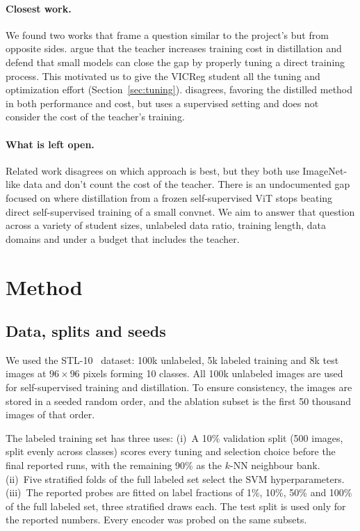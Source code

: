 \documentclass[letterpaper,11pt]{article}
\begin{document}
\paragraph{Closest work.}
We found two works that frame a question similar to the project's but from opposite sides. \citet{shi2022smallssl} argue that the teacher increases training cost in distillation and defend that small models can close the gap by properly tuning a direct training process. This motivated us to give the VICReg student all the tuning and optimization effort (Section~\ref{sec:tuning}). \citet{farhat2024distillalt} disagrees, favoring the distilled method in both performance and cost, but uses a supervised setting and does not consider the cost of the teacher's training.

\paragraph{What is left open.}
Related work disagrees on which approach is best, but they both use ImageNet-like data and don't count the cost of the teacher. There is an undocumented gap focused on where distillation from a frozen self-supervised ViT stops beating direct self-supervised training of a small convnet. We aim to answer that question across a variety of student sizes, unlabeled data ratio, training length, data domains and under a budget that includes the teacher.


\section{Method}
\label{sec:method}

\subsection{Data, splits and seeds}
\label{sec:data}

We used the STL-10~\citep{coates2011stl10} dataset: 100k unlabeled, 5k labeled training and 8k test
images at $96\times96$ pixels forming 10 classes. All 100k unlabeled images are used for
self-supervised training and distillation.
To ensure consistency, the images are stored in a seeded random order, and the ablation subset is the first 50 thousand images of that order. 

The labeled training set has three uses: (i)~A 10\% validation split (500 images, split evenly across classes) scores every tuning and selection choice before the final reported runs, with the remaining 90\% as the $k$-NN neighbour bank.
(ii)~Five stratified folds of the full labeled set select the SVM hyperparameters.
(iii)~The reported probes are fitted on label fractions of 1\%, 10\%, 50\% and 100\% of the
full labeled set, three stratified draws each. The test split is used only for the reported numbers. Every encoder was probed on the same subsets.
\end{document}
